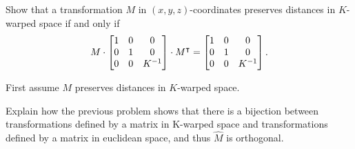 \documentclass{ximera}
\begin{document}
\begin{problem}
Show that a transformation $M$ in
$\left(x,y,z\right)$-coordinates preserves distances in $K$-warped space if and only if%
\[
M\cdot\begin{bmatrix}
1 & 0 & 0\\
0 & 1 & 0\\
0 & 0 & K^{-1}
\end{bmatrix}
  \cdot M^\intercal=\begin{bmatrix}
1 & 0 & 0\\
0 & 1 & 0\\
0 & 0 & K^{-1}
\end{bmatrix}. 
  \]
  \begin{hint}
   First assume $M$ preserves distances in $K$-warped space. 
   \end{hint} 
   \begin{hint} 
   Explain how the previous problem shows that there is a bijection between transformations defined by a matrix in K-warped space and transformations defined by a matrix in euclidean space, and thus $\hat{M}$ is orthogonal. 
  \end{hint}
  


\end{problem}
\end{document}
